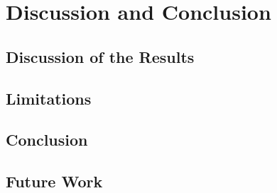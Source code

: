 \cleardoubleoddpage%
\chapter{Discussion and Conclusion}
\label{sec:conclusion}

\section{Discussion of the Results}
\label{sec:conclusion:discussion}

\section{Limitations}
\label{sec:conclusion:limitations}

\section{Conclusion}
\label{sec:conclusion:conclusion}

\section{Future Work}
\label{sec:conclusion:future-work}

